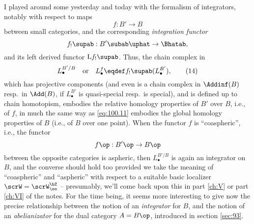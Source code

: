 I played around some yesterday and today with the formalism of
integrators, notably with respect to maps
\[ f:B'\to B\]
between small categories, and the corresponding \emph{integration
  functor}
\[ f_!\supab: {B'}\subab\uphat \to \Bhatab,\]
and its left derived functor $\mathrm Lf_!\supab$. Thus, the chain
complex in \Bhatab
\begin{equation}
  \label{eq:100.14}
  L_\bullet^{B'/B}\quad\text{or}\quad
  L_\bullet^f \eqdef f_!\supab(L_\bullet^{B'}),\tag{14}
\end{equation}
which has projective components (and even is a chain complex in
$\Addinf(B)$ resp.\ in $\Add(B)$, if $L_\bullet^{B'}$ is quasi-special
resp.\ is special), and is defined up to chain homotopism, embodies
the relative homology properties of $B'$ over $B$, i.e., of $f$, in
much the same way as \eqref{eq:100.11} embodies the global homology
properties of $B$ (i.e., of $B$ over one point). When the functor $f$
is ``coaspheric'', i.e., the functor
\[f\op:{B'}\op \to B\op\]
between the opposite categories is aspheric, then $L_\bullet^{B'/B}$
is again an integrator on $B$, and the converse should hold too
provided we take the meaning of ``coaspheric'' and ``aspheric'' with
respect to a suitable basic localizer $\scrW=\scrW_\oo^{\bZ}$ --
presumably, we'll come back upon this in part \ref{ch:V} or part
\ref{ch:VI} of the notes. For the time being, it seems more
interesting to give now the precise relationship between the notion of
an \emph{integrator} for $B$, and the notion of an
\emph{abelianizator} for the dual category $A=B\op$, introduced in
section \ref{sec:93}.

\medbreak

